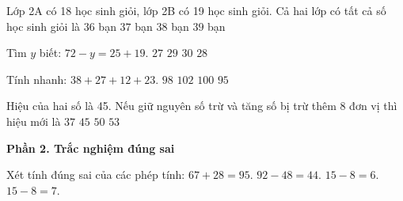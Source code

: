 \begin{ex} %
Lớp 2A có 18 học sinh giỏi, lớp 2B có 19 học sinh giỏi. Cả hai lớp có tất cả số học sinh giỏi là
\choice
{$36$ bạn}
{\True $37$ bạn}
{$38$ bạn}
{$39$ bạn}
\end{ex}

\begin{ex} %
Tìm $y$ biết: $72 - y = 25 + 19$.
\choice
{$27$}
{$29$}
{$30$}
{\True $28$}
\end{ex}

\begin{ex} %
Tính nhanh: $38 + 27 + 12 + 23$.
\choice
{$98$}
{$102$}
{\True $100$}
{$95$}
\end{ex}

\begin{ex} %
Hiệu của hai số là 45. Nếu giữ nguyên số trừ và tăng số bị trừ thêm 8 đơn vị thì hiệu mới là
\choice
{$37$}
{$45$}
{$50$}
{\True $53$}
\end{ex}

\textbf{Phần 2. Trắc nghiệm đúng sai}

\begin{ex} %
Xét tính đúng sai của các phép tính:
\choiceTF
{\True $67 + 28 = 95$.}
{\True $92 - 48 = 44$.}
{$15 - 8 = 6$.}
{\True $15 - 8 = 7$.}
\end{ex}


